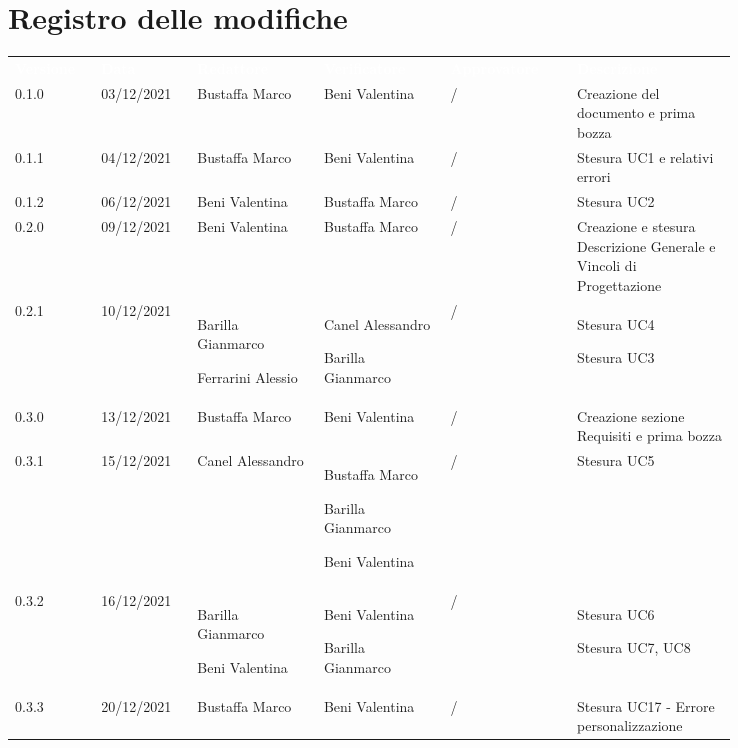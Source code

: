 \section*{Registro delle modifiche}

{\renewcommand{\arraystretch}{1.5}
\scriptsize
\begin{tabular}{p{0.10\linewidth}p{0.10\linewidth}p{0.15\linewidth}p{0.15\linewidth}p{0.15\linewidth}p{0.19\linewidth}}
	\rowcolor[RGB]{33, 73, 50}
	\textcolor{white}{\textbf{Versione}} & \textcolor{white}{\textbf{Data}} &
	\textcolor{white}{\textbf{Redattore}} & \textcolor{white}{\textbf{Verificatore}} &
	\textcolor{white}{\textbf{Approvatore}} & \textcolor{white}{\textbf{Descrizione}}\\
	\rowcolor[RGB]{216, 235, 171}
	0.1.0 & 03/12/2021 & Bustaffa Marco& Beni Valentina &/& Creazione del documento e prima bozza\\
	\rowcolor[RGB]{233, 245, 206}
	0.1.1 & 04/12/2021 & Bustaffa Marco& Beni Valentina &/& Stesura UC1 e relativi errori\\
	\rowcolor[RGB]{216, 235, 171}
	0.1.2 & 06/12/2021 & Beni Valentina& Bustaffa Marco &/& Stesura UC2\\
	\rowcolor[RGB]{233, 245, 206}
	0.2.0 & 09/12/2021 & Beni Valentina& Bustaffa Marco &/& Creazione e stesura Descrizione Generale e Vincoli di Progettazione\\
	\rowcolor[RGB]{216, 235, 171}
	0.2.1 & 10/12/2021 & Barilla Gianmarco \par Ferrarini Alessio& Canel Alessandro \par Barilla Gianmarco &/& Stesura UC4 \par Stesura UC3 \\
	\rowcolor[RGB]{233, 245, 206}
	0.3.0 & 13/12/2021 & Bustaffa Marco& Beni Valentina &/& Creazione sezione Requisiti e prima bozza\\
	\rowcolor[RGB]{216, 235, 171}
	0.3.1 & 15/12/2021 & Canel Alessandro& Bustaffa Marco \par Barilla Gianmarco \par Beni Valentina&/& Stesura UC5\\
	\rowcolor[RGB]{233, 245, 206}
	0.3.2 & 16/12/2021 & Barilla Gianmarco \par Beni Valentina& Beni Valentina \par Barilla Gianmarco &/& Stesura UC6 \par Stesura UC7, UC8\\
	\rowcolor[RGB]{216, 235, 171}
	0.3.3 & 20/12/2021 & Bustaffa Marco& Beni Valentina &/& Stesura UC17 - Errore personalizzazione\\

\end{tabular}}
